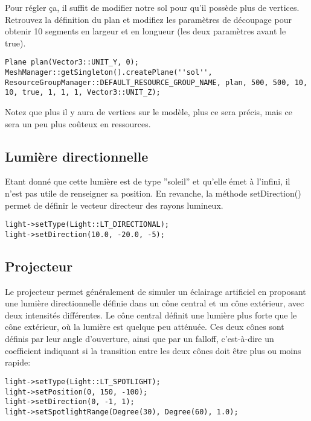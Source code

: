\documentclass[10pt,a4paper]{report}
\begin{document}
Pour r\'egler \c{c}a, il suffit de modifier notre sol pour qu'il poss\`ede plus de vertices. Retrouvez la d\'efinition du plan et modifiez les param\`etres de d\'ecoupage pour obtenir 10 segments en largeur et en longueur (les deux param\`etres avant le true).

\begin{lstlisting}
Plane plan(Vector3::UNIT_Y, 0);
MeshManager::getSingleton().createPlane(''sol'', ResourceGroupManager::DEFAULT_RESOURCE_GROUP_NAME, plan, 500, 500, 10, 10, true, 1, 1, 1, Vector3::UNIT_Z);
\end{lstlisting}



Notez que plus il y aura de vertices sur le mod\`ele, plus ce sera pr\'ecis, mais ce sera un peu plus co\^uteux en ressources.




\subsection{Lumi\`ere directionnelle}

Etant donn\'e que cette lumi\`ere est de type ''soleil'' et qu'elle \'emet \`{a} l'infini, il n'est pas utile de renseigner sa position. En revanche, la m\'ethode setDirection() permet de d\'efinir le vecteur directeur des rayons lumineux.

\begin{lstlisting}
light->setType(Light::LT_DIRECTIONAL);
light->setDirection(10.0, -20.0, -5);
\end{lstlisting}






\subsection{Projecteur}

Le projecteur permet g\'en\'eralement de simuler un \'eclairage artificiel en proposant une lumi\`ere directionnelle d\'efinie dans un c\^one central et un c\^one ext\'erieur, avec deux intensit\'es diff\'erentes. Le c\^one central d\'efinit une lumi\`ere plus forte que le c\^one ext\'erieur, o\`{u} la lumi\`ere est quelque peu att\'enu\'ee. Ces deux c\^ones sont d\'efinis par leur angle d'ouverture, ainsi que par un falloff, c'est-\`{a}-dire un coefficient indiquant si la transition entre les deux c\^ones doit \^etre plus ou moins rapide:
\begin{lstlisting}
light->setType(Light::LT_SPOTLIGHT);
light->setPosition(0, 150, -100);
light->setDirection(0, -1, 1);
light->setSpotlightRange(Degree(30), Degree(60), 1.0);
\end{lstlisting}
\end{document}

